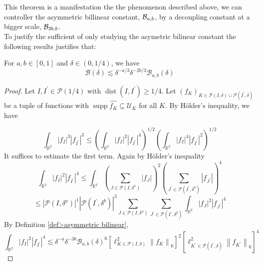 This theorem is a manifestation the the phenomenon described above, we can controller the asymmetric billinear constant, $\mathcal{B}_{a,b}$, by a decoupling constant at a bigger scale, $\mathcal{B}_{2b,b}$.\\

To justify the sufficient of only studying the asymetric bilinear constant the following results justifies that:
\begin{lem}
For $a, b \in[0,1]$ and $\delta \in(0,1 / 4)$, we have
\begin{equation*}
\mathcal{B}(\delta) \lesssim \delta^{-a/3 } \delta^{-2b/3} \mathcal{B}_{a, b}(\delta) 
\end{equation*}
\end{lem}

\begin{proof}
     Let $I, I^{\prime} \in \mathcal{P}(1 / 4)$ with $\operatorname{dist}\left(I, I^{\prime}\right) \geqslant 1 / 4$. Let $\left(f_{K}\right)_{K \in \mathcal{P}(I, \delta) \cup \mathcal{P}\left(I^{\prime}, \delta\right)}$ be a tuple of functions with $\operatorname{supp} \widehat{f_{K}} \subseteq \mathcal{U}_{K}$ for all $K$. By Hölder's inequality, we have

\begin{equation*}
\int_{\mathbb{R}^{2}}\left|f_{I}\right|^{3}\left|f_{I^{\prime}}\right|^{3} \leqslant
\left(\int_{\mathbb{R}^{2}}\left|f_{I}\right|^{2}\left|f_{I^{\prime}}\right|^{4}\right)^{1 / 2}\left(\int_{\mathbb{R}^{2}}\left|f_{I}\right|^{4}\left|f_{I^{\prime}}\right|^{2}\right)^{1 / 2} 
\end{equation*}
It suffices to estimate the first term. Again by Hölder's inequality 
\begin{equation}
\int_{\mathbb{R}^{2}}\left|f_{I}\right|^{2}\left|f_{I^{\prime}}\right|^{4}\leqslant \int_{\mathbb{R}^{2}}\left(\sum_{J \in \mathcal{P}\left(I, \delta^{a}\right)}\left|f_{J}\right|\right)^{2}\left(\sum_{J^{\prime} \in \mathcal{P}\left(I^{\prime}, \delta^{b}\right)}\left|f_{J^{\prime}}\right|\right)^{4}
\end{equation}
\begin{equation}
    \leqslant \left|\mathcal{P}\left(I, \delta^{a}\right)\right|^{1}\left|\mathcal{P}\left(I^{\prime}, \delta^{b}\right)\right|^{3} \sum_{J \in \mathcal{P}\left(I, \delta^{a}\right)} \sum_{J^{\prime} \in \mathcal{P}\left(I^{\prime}, \delta^{b}\right)} \int_{\mathbb{R}^{2}}\left|f_{J}\right|^{2}\left|f_{J^{\prime}}\right|^{4}
\end{equation}
By Definition \ref{def>asymmetric bilinear},
\begin{equation}
\int_{\mathbb{R}^{2}}\left|f_{I}\right|^{2}\left|f_{I^{\prime}}\right|^{4} \lesssim \delta^{-a} \delta^{-3b} \mathcal{B}_{a, b}(\delta)^{6}\left[\ell_{K \in \mathcal{P}(I, \delta)}^{2}\left\|f_{K}\right\|_{6}\right]^{2}\left[\ell_{K^{\prime} \in \mathcal{P}\left(I^{\prime}, \delta\right)}^{2}\left\|f_{K^{\prime}}\right\|_{6}\right]^{4}
\end{equation}
\end{proof}

